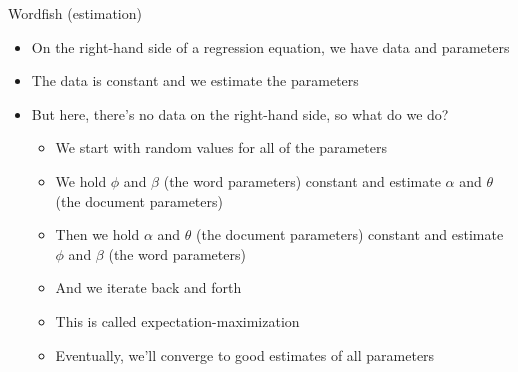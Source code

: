 \documentclass[pdf, 9pt, fleqn, handout]{beamer}
\begin{document}
\begin{frame}{Wordfish (estimation)}
\begin{itemize}
\item On the right-hand side of a regression equation, we have data and parameters \\[1em]
\item The data is constant and we estimate the parameters \\[1em]
\item But here, there's no data on the right-hand side, so what do we do? \\[0.5em]
\begin{itemize}
\item We start with random values for all of the parameters \\[0.5em]
\item We hold $\phi$ and $\beta$ (the word parameters) constant and estimate $\alpha$ and $\theta$ (the document parameters) \\[0.5em]
\item Then we hold $\alpha$ and $\theta$ (the document parameters) constant and estimate $\phi$ and $\beta$ (the word parameters) \\[0.5em]
\item And we iterate back and forth \\[0.5em]
\item This is called expectation-maximization \\[0.5em]
\item Eventually, we'll converge to good estimates of all parameters
\end{itemize}
\end{itemize}
\end{frame}
\end{document}
